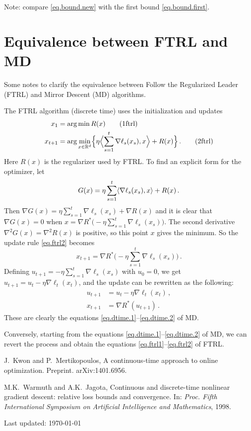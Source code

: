 \documentclass[12pt]{article}
\theoremstyle{plain}
\theoremstyle{definition}
\theoremstyle{remark}
\begin{document}
\medskip

Note: compare \eqref{eq.bound.new} with the first bound \eqref{eq.bound.first}.



\newpage

\section*{Equivalence between FTRL and MD}

Some notes to clarify the equivalence between 
Follow the Regularized Leader (FTRL) and Mirror Descent (MD) algorithms.

\medskip

The FTRL algorithm (discrete time) uses the initialization and updates
\begin{align}
x_1 &= \arg\min R(x) \label{eq.ftrl1} \tag{1ftrl} \\
x_{t+1} &= \arg\min_{x \in \mathbb{R}^d} \Bigl\{ \eta \Bigl\langle { \sum_{s=1}^{t} \nabla\ell_s(x_{s}), x} \Bigr\rangle + R(x)\Bigr\}\,.
 \label{eq.ftrl2} 
\tag{2ftrl}
\end{align}
Here $R(x)$ is the regularizer used by FTRL.
To find an explicit form for the optimizer, let
$$
G(x) = \eta \sum_{s=1}^{t} \langle { \nabla\ell_s(x_{s}), x}\rangle + R(x)\,.
$$
Then $\nabla G(x) = \eta \sum_{s=1}^{t} \nabla\ell_s(x_{s}) + \nabla R(x)$
and it is clear that $\nabla G(x) = 0$ 
when $x = \nabla R^{*} \bigl( -\eta \sum_{s=1}^{t} \nabla\ell_s(x_{s}) \bigr)$.
The second derivative $\nabla^2 G(x) = \nabla^2 R(x)$ is positive,
so this point $x$ gives the minimum.
So the update rule \eqref{eq.ftrl2} becomes
$$
x_{t+1} = \nabla R^{*} \bigl( -\eta \sum_{s=1}^{t} \nabla\ell_s(x_{s}) \bigr)\,.
$$
Defining $u_{t+1} = -\eta \sum_{s=1}^{t} \nabla\ell_s(x_{s})$ with $u_{0} = 0$,
we get $u_{t+1} = u_{t} - \eta \nabla\ell_t(x_{t})$,
and the update can be rewritten as the following:
\begin{align*}
u_{t+1} &= u_{t} - \eta \nabla \ell_{t}(x_{t})\,, \\
x_{t+1} &= \nabla R^{*}(u_{t+1})\,. 
\end{align*}
These are clearly the equations \eqref{eq.dtime.1}--\eqref{eq.dtime.2} of MD.

\medskip

Conversely, starting from the equations \eqref{eq.dtime.1}--\eqref{eq.dtime.2} of MD,
we can revert the process and obtain the equations \eqref{eq.ftrl1}--\eqref{eq.ftrl2} of FTRL.

\medskip

\begin{thebibliography}{biblio}

  J.~Kwon and P.~Mertikopoulos,
  A continuous-time approach to online optimization.
  Preprint. arXiv:1401.6956.

  M.K.~Warmuth and A.K.~Jagota,
  Continuous and discrete-time nonlinear gradient descent: relative loss bounds and convergence.
  In: 
  \textit{Proc. Fifth International Symposium on Artificial Intelligence and Mathematics}, 1998.


\end{thebibliography}


\vspace{.5cm}


\noindent
Last updated: \today
\end{document}
